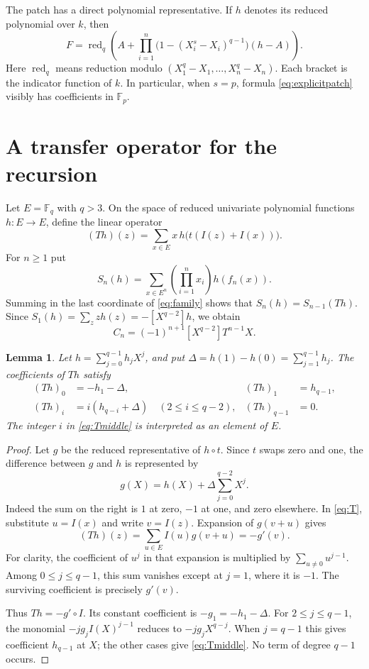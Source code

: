 \documentclass[11pt]{article}
\newtheorem{lemma}[theorem]{Lemma}
\theoremstyle{remark}\newtheorem{remark}[theorem]{Remark}
\newcommand{\F}{\mathbb F}
\newcommand{\red}{\operatorname{red}}
\begin{document}
The patch has a direct polynomial representative. If $h$ denotes its reduced
polynomial over $k$, then
\begin{equation}\label{eq:explicitpatch}
 F=\red_q\left(
 A+\prod_{i=1}^n\bigl(1-(X_i^s-X_i)^{q-1}\bigr)(h-A)
 \right).
\end{equation}
Here $\red_q$ means reduction modulo $(X_1^q-X_1,\ldots,X_n^q-X_n)$.
Each bracket is the indicator function of $k$. In particular, when $s=p$,
formula \eqref{eq:explicitpatch} visibly has coefficients in $\F_p$.

\section{A transfer operator for the recursion}

Let $E=\F_q$ with $q>3$. On the space of reduced univariate polynomial
functions $h:E\to E$, define the linear operator
\begin{equation}\label{eq:T}
 (Th)(z)=\sum_{x\in E}x\,h\bigl(t(I(z)+I(x))\bigr).
\end{equation}
For $n\geq1$ put
\[
 S_n(h)=\sum_{x\in E^n}\left(\prod_{i=1}^n x_i\right)h(f_n(x)).
\]
Summing in the last coordinate of \eqref{eq:family} shows that
$S_n(h)=S_{n-1}(Th)$. Since $S_1(h)=\sum_z zh(z)=-[X^{q-2}]h$, we obtain
\begin{equation}\label{eq:transfercoefficient}
 C_n=(-1)^{n+1}[X^{q-2}]T^{n-1}X.
\end{equation}

\begin{lemma}\label{lem:T}
Let $h=\sum_{j=0}^{q-1}h_jX^j$, and put
$\Delta=h(1)-h(0)=\sum_{j=1}^{q-1}h_j$. The coefficients of $Th$ satisfy
\begin{align}
 (Th)_0&=-h_1-\Delta, & (Th)_1&=h_{q-1},\label{eq:Tend}\\
 (Th)_i&=i(h_{q-i}+\Delta)\quad(2\leq i\leq q-2),
 & (Th)_{q-1}&=0.\label{eq:Tmiddle}
\end{align}
The integer $i$ in \eqref{eq:Tmiddle} is interpreted as an element of $E$.
\end{lemma}

\begin{proof}
Let $g$ be the reduced representative of $h\circ t$. Since $t$ swaps zero and
one, the difference between $g$ and $h$ is represented by
\[
 g(X)=h(X)+\Delta\sum_{j=0}^{q-2}X^j.
\]
Indeed the sum on the right is $1$ at zero, $-1$ at one, and zero elsewhere.
In \eqref{eq:T}, substitute $u=I(x)$ and write $v=I(z)$. Expansion of $g(v+u)$
gives
\[
 (Th)(z)=\sum_{u\in E}I(u)g(v+u)=-g'(v).
\]
For clarity, the coefficient of $u^j$ in that expansion is multiplied by
$\sum_{u\ne0}u^{j-1}$. Among $0\leq j\leq q-1$, this sum vanishes except
at $j=1$, where it is $-1$. The surviving coefficient is precisely $g'(v)$.

Thus $Th=-g'\circ I$. Its constant coefficient is $-g_1=-h_1-\Delta$.
For $2\leq j\leq q-1$, the monomial
$-j g_jI(X)^{j-1}$ reduces to $-j g_jX^{q-j}$.
When $j=q-1$ this gives coefficient $h_{q-1}$ at $X$; the other cases give
\eqref{eq:Tmiddle}. No term of degree $q-1$ occurs.
\end{proof}
\end{document}
